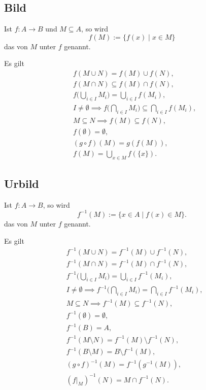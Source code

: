 \newpage
\subsection{Bild}
\begin{definition}[Bild]
Ist $f\colon A\to B$ und $M\subseteq A$, so wird
\begin{equation}
f(M) := \{f(x)\mid x\in M\}
\end{equation}
das  von $M$ unter $f$ genannt.
\end{definition}
Es gilt
\begin{align}
&f(M\cup N) = f(M)\cup f(N),\\
&f(M\cap N) \subseteq f(M)\cap f(N),\\
&f\Big(\bigcup_{i\in I}M_i\Big) = \bigcup_{i\in I} f(M_i),\\
&I\ne\emptyset\implies f\Big(\bigcap_{i\in I} M_i\Big) \subseteq \bigcap_{i\in I} f(M_i),\\
&M\subseteq N\implies f(M)\subseteq f(N),\\
&f(\emptyset) = \emptyset,\\
&(g\circ f)(M) = g(f(M)),\\
&f(M) = \bigcup_{x\in M} f(\{x\}).
\end{align}

\subsection{Urbild}
\begin{definition}[Urbild]
Ist $f\colon A\to B$, so wird
\begin{equation}
f^{-1}(M) := \{x\in A\mid f(x)\in M\}.
\end{equation}
das  von $M$ unter $f$ genannt.
\end{definition}
Es gilt
\begin{align}
& f^{-1}(M\cup N) = f^{-1}(M)\cup f^{-1}(N),\\
& f^{-1}(M\cap N) = f^{-1}(M)\cap f^{-1}(N),\\
& f^{-1}\Big(\bigcup_{i\in I}M_i\Big) = \bigcup_{i\in I} f^{-1}(M_i),\\
& I\ne\emptyset\implies f^{-1}\Big(\bigcap_{i\in I} M_i\Big) = \bigcap_{i\in I}f^{-1}(M_i),\\
& M\subseteq N\implies f^{-1}(M)\subseteq f^{-1}(N),\\
& f^{-1}(\emptyset) = \emptyset,\\
& f^{-1}(B) = A,\\
& f^{-1}(M\setminus N) = f^{-1}(M)\setminus f^{-1}(N),\\
& f^{-1}(B\setminus M) = B\setminus f^{-1}(M),\\
& (g\circ f)^{-1}(M) = f^{-1}(g^{-1}(M)),\\
& (f|_M)^{-1}(N) = M\cap f^{-1}(N).
\end{align}


